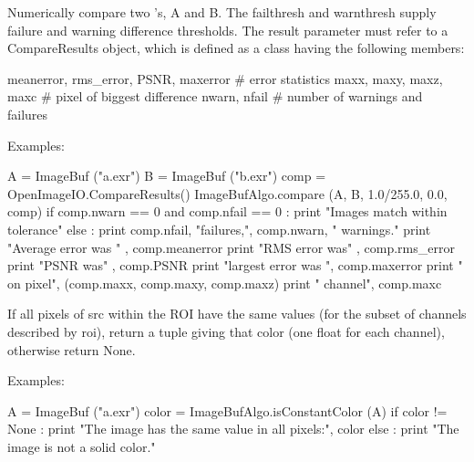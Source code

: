  

Numerically compare two \ImageBuf's, {\cf A} and {\cf B}. The {\cf failthresh}
and {\cf warnthresh} supply failure and warning difference thresholds.
The {\cf result} parameter must refer to a {\cf CompareResults} object,
which is defined as a class having the following members:
\begin{code}
    meanerror, rms_error, PSNR, maxerror  # error statistics
    maxx, maxy, maxz, maxc                # pixel of biggest difference
    nwarn, nfail                          # number of warnings and failures
\end{code}

\smallskip
\noindent Examples:
\begin{code}
    A = ImageBuf ("a.exr")
    B = ImageBuf ("b.exr")
    comp = OpenImageIO.CompareResults()
    ImageBufAlgo.compare (A, B, 1.0/255.0, 0.0, comp)
    if comp.nwarn == 0 and comp.nfail == 0 :
        print "Images match within tolerance"
    else :
        print comp.nfail, "failures,", comp.nwarn, " warnings."
        print "Average error was " , comp.meanerror
        print "RMS error was" , comp.rms_error
        print "PSNR was" , comp.PSNR
        print "largest error was ", comp.maxerror
        print "  on pixel", (comp.maxx, comp.maxy, comp.maxz)
        print "  channel", comp.maxc
\end{code}
\apiend


 

If all pixels of {\cf src} within the ROI have the same values (for the
subset of channels described by {\cf roi}), return a tuple giving that
color (one {\cf float} for each channel), otherwise return {\cf None}.

\smallskip
\noindent Examples:
\begin{code}
    A = ImageBuf ("a.exr")
    color = ImageBufAlgo.isConstantColor (A)
    if color != None :
        print "The image has the same value in all pixels:", color
    else :
        print "The image is not a solid color."
\end{code}
\apiend


 

